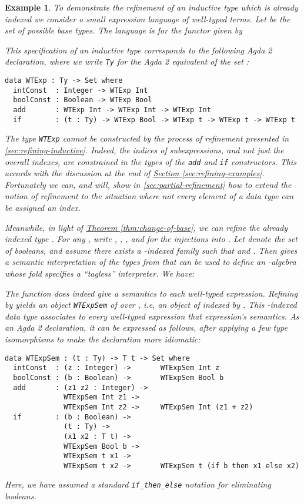 \documentclass{LMCS}
\newtheorem{eorollary}{Example}
\newcommand{\thmref}[1]{\hyperref[#1]{Theorem \ref*{#1}}}
\begin{document}
\begin{eorollary}\label{ex:indexed-refinement}
  To demonstrate the refinement of an inductive type which is already
  indexed we consider a small expression language of well-typed
  terms. Let  be the
  set of possible base types. The language is 
  for the functor  given by

This specification of an inductive type corresponds to the following
Agda 2 declaration, where we write \verb|Ty| for the Agda 2
equivalent of the set :
\begin{verbatim}
data WTExp : Ty -> Set where
  intConst  : Integer -> WTExp Int
  boolConst : Boolean -> WTExp Bool
  add       : WTExp Int -> WTExp Int -> WTExp Int
  if        : (t : Ty) -> WTExp Bool -> WTExp t -> WTExp t -> WTExp t
\end{verbatim}
The type \verb|WTExp| cannot be constructed by the process of
refinement presented in \autoref{sec:refining-inductive}. Indeed, the
indices of subexpressions, and not just the overall indexes, are
constrained in the types of the \texttt{add} and \texttt{if}
constructors. This accords with the discussion at the end of
\hyperref[sec:refining-examples]{Section
  \ref*{sec:refining-examples}}. Fortunately we can, and will, show in
\autoref{sec:partial-refinement} how to extend the notion of
refinement to the situation where not every element of a data type can
be assigned an index.

Meanwhile, in light of \thmref{thm:change-of-base}, we can refine the
already indexed type . For any , write
, , , and
 for the injections into . Let  denote the set of booleans, and
assume there exists a -indexed family  such that  and . Then
 gives a semantic interpretation of the types from 
that can be used to define an -algebra
 whose fold specifies a ``tagless'' interpreter. We
have:

The function  does indeed give a semantics to each
well-typed expression. Refining  by
 yields an object \verb|WTExpSem| of
 over
, i.e, an object of  indexed by
. This -indexed data type
associates to every well-typed expression that expression's
semantics. As an Agda 2 declaration, it can be expressed as follows,
after applying a few type isomorphisms to make the declaration more
idiomatic:
\begin{verbatim}
data WTExpSem : (t : Ty) -> T t -> Set where
  intConst  : (z : Integer) ->       WTExpSem Int z
  boolConst : (b : Boolean) ->       WTExpSem Bool b
  add       : (z1 z2 : Integer) ->
              WTExpSem Int z1 ->
              WTExpSem Int z2 ->     WTExpSem Int (z1 + z2)
  if        : (b : Boolean) ->
              (t : Ty) ->
              (x1 x2 : T t) ->
              WTExpSem Bool b ->
              WTExpSem t x1 ->
              WTExpSem t x2 ->       WTExpSem t (if b then x1 else x2)
\end{verbatim}
Here, we have assumed a standard \texttt{if\_then\_else} notation for
eliminating booleans.
\end{eorollary}
\end{document}

